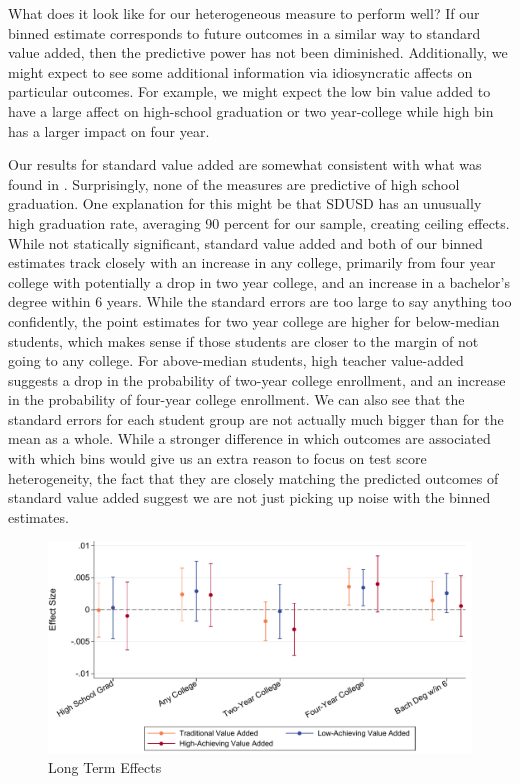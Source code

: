 \documentclass[12pt]{article}
\theoremstyle{definition}
\theoremstyle{definition}
\theoremstyle{definition}
\theoremstyle{definition}
\begin{document}
    What does it look like for our heterogeneous measure to perform well? If our binned estimate corresponds to future outcomes in a similar way to standard value added, then the predictive power has not been diminished. Additionally, we might expect to see some additional information via idiosyncratic affects on particular outcomes. For example, we might expect the low bin value added to have a large affect on high-school graduation or two year-college while high bin has a larger impact on four year. 

    Our results for standard value added are somewhat consistent with what was found in \cite{chetty2014measuring2}. Surprisingly, none of the measures are predictive of high school graduation. One explanation for this might be that SDUSD has an unusually high graduation rate, averaging 90 percent for our sample, creating ceiling effects. While not statically significant, standard value added and both of our binned estimates track closely with an increase in any college, primarily from four year college with potentially a drop in two year college, and an increase in a bachelor's degree within 6 years. While the standard errors are too large to say anything too confidently, the point estimates for two year college are higher for below-median students, which makes sense if those students are closer to the margin of not going to any college. For above-median students, high teacher value-added suggests a drop in the probability of two-year college enrollment, and an increase in the probability of four-year college enrollment. We can also see that the standard errors for each student group are not actually much bigger than for the mean as a whole. While a stronger difference in which outcomes are associated with which bins would give us an extra reason to focus on test score heterogeneity, the fact that they are closely matching the predicted outcomes of standard value added suggest we are not just picking up noise with the binned estimates. 

    \begin{figure}[H]
    \begin{center}
    \includegraphics[width=.9\textwidth]{Working_Paper/WP_Figures/fig2b_longterm.pdf}
    \end{center}
        \caption{Long Term Effects}
        \label{fig_long_term}
    \end{figure}
\end{document}
